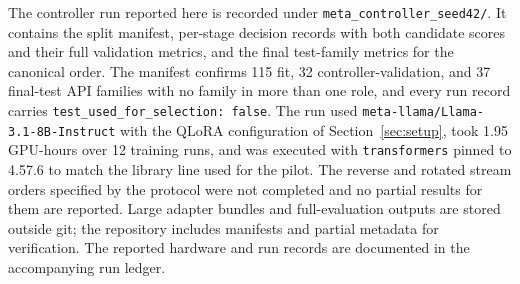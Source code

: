 \documentclass{article}
\begin{document}
The controller run reported here is recorded under \texttt{meta\_controller\_seed42/}. It contains the split manifest, per-stage decision records with both candidate scores and their full validation metrics, and the final test-family metrics for the canonical order. The manifest confirms 115 fit, 32 controller-validation, and 37 final-test API families with no family in more than one role, and every run record carries \texttt{test\_used\_for\_selection: false}. The run used \texttt{meta-llama/Llama-3.1-8B-Instruct} with the QLoRA configuration of Section~\ref{sec:setup}, took 1.95 GPU-hours over 12 training runs, and was executed with \texttt{transformers} pinned to 4.57.6 to match the library line used for the pilot. The reverse and rotated stream orders specified by the protocol were not completed and no partial results for them are reported. Large adapter bundles and full-evaluation outputs are stored outside git; the repository includes manifests and partial metadata for verification. The reported hardware and run records are documented in the accompanying run ledger.
\end{document}
